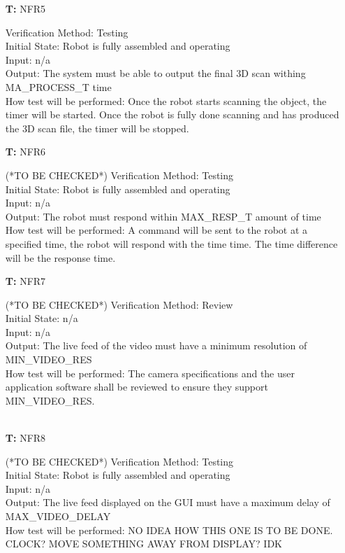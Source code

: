 \documentclass[12pt, titlepage]{article}
\newcounter{tnum} %
\begin{document}
\begin{itemize}
\item[\textbf{T\refstepcounter{tnum}\thetnum:}]{NFR5\\}

Verification Method: Testing	\\				
Initial State: Robot is fully assembled and operating	\\			
Input: n/a\\
Output: The system must be able to output the final 3D scan withing MA\_PROCESS\_T time \\
How test will be performed: Once the robot starts scanning the object, the timer will be started. Once the robot is fully done scanning and has produced the 3D scan file, the timer will be stopped. \\

\item[\textbf{T\refstepcounter{tnum}\thetnum:}]{NFR6\\}

(*TO BE CHECKED*)
Verification Method: Testing	\\				
Initial State: Robot is fully assembled	and operating\\	
Input: n/a\\
Output: The robot must respond within MAX\_RESP\_T amount of time \\
How test will be performed: A command will be sent to the robot at a specified time, the robot will respond with the time time. The time difference will be the response time. \\

\item[\textbf{T\refstepcounter{tnum}\thetnum:}]{NFR7\\}

(*TO BE CHECKED*)
Verification Method: Review	\\				
Initial State: n/a	\\			
Input: n/a\\
Output: The live feed of the video must have a minimum resolution of  MIN\_VIDEO\_RES \\
How test will be performed: The camera specifications and the user application software shall be reviewed to ensure they support MIN\_VIDEO\_RES.\\ \\

\item[\textbf{T\refstepcounter{tnum}\thetnum:}]{NFR8\\}

(*TO BE CHECKED*)
Verification Method: Testing	\\				
Initial State: Robot is fully assembled	and operating\\			
Input: n/a\\
Output: The live feed displayed on the GUI must have a maximum delay of MAX\_VIDEO\_DELAY \\
How test will be performed: NO IDEA HOW THIS ONE IS TO BE DONE. CLOCK? MOVE SOMETHING AWAY FROM DISPLAY? IDK

\end{itemize}
\end{document}
